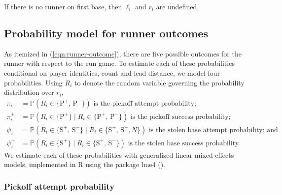 \documentclass{article}
\begin{document}
    If there is no runner on first base, then $\ell_i$ and $r_i$ are undefined.%

    \subsection{Probability model for runner outcomes}
    \label{sec:prob-runner-outcome}

      As itemized in (\ref{eqn:runner-outcome}), there are five possible outcomes for the runner with respect to the run game. To estimate each of these probabilities conditional on player identities, count and lead distance, we model four probabilities. Using $R_i$ to denote the random variable governing the probability distribution over $r_i$,
      \begin{align*}
        \pi_i    &= \mathbb{P}(R_i \in \{\mbox{P}^+,\, \mbox{P}^-\}) \mbox{ is the pickoff attempt probability;}\\
        \pi_i^+  &= \mathbb{P}(R_i \in \{\mbox{P}^+\} \mid R_i \in \{\mbox{P}^+,\, \mbox{P}^-\}) \mbox{ is the pickoff success probability;}\\
        \psi_i   &= \mathbb{P}(R_i \in \{\mbox{S}^+,\, \mbox{S}^-\} \mid R_i \in \{\mbox{S}^+,\, \mbox{S}^-, N\}) \mbox{ is the stolen base attempt probability; and}\\
        \psi_i^+ &= \mathbb{P}(R_i \in \{\mbox{S}^+\} \mid R_i \in \{\mbox{S}^+,\, \mbox{S}^-\}) \mbox{ is the stolen base success probability.}
      \end{align*}
      We estimate each of these probabilities with generalized linear mixed-effects models, implemented in R using the package lme4 (\cite{bates_fitting_2015}).

      \subsubsection{Pickoff attempt probability}
      \label{sec:prob-po-attempt}
\end{document}
